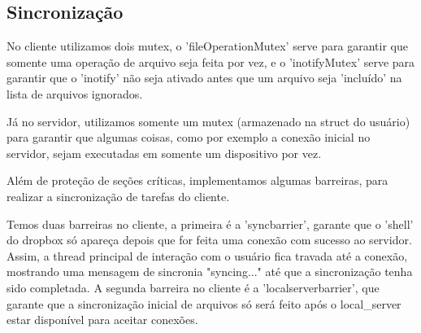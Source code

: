 \documentclass[a4paper]{article}
\begin{document}
\subsection{Sincronização}

No cliente utilizamos dois mutex, o 'fileOperationMutex' serve para garantir que somente uma operação de arquivo seja feita por vez, e o 'inotifyMutex' serve para garantir que o 'inotify' não seja ativado antes que um arquivo seja 'incluído' na lista de arquivos ignorados.

Já no servidor, utilizamos somente um mutex (armazenado na struct do usuário) para garantir que algumas coisas, como por exemplo a conexão inicial no servidor, sejam executadas em somente um dispositivo por vez.

Além de proteção de seções críticas, implementamos algumas barreiras, para realizar a sincronização de tarefas do cliente.

Temos duas barreiras no cliente, a primeira é a 'syncbarrier', garante que o 'shell' do dropbox só apareça depois que for feita uma conexão com sucesso ao servidor. Assim, a thread principal de interação com o usuário fica travada até a conexão, mostrando uma mensagem de sincronia "syncing..." até que a sincronização tenha sido completada.
A segunda barreira no cliente é a 'localserverbarrier', que garante que a sincronização inicial de arquivos só será feito após o local\_server estar disponível para aceitar conexões.
\end{document}

